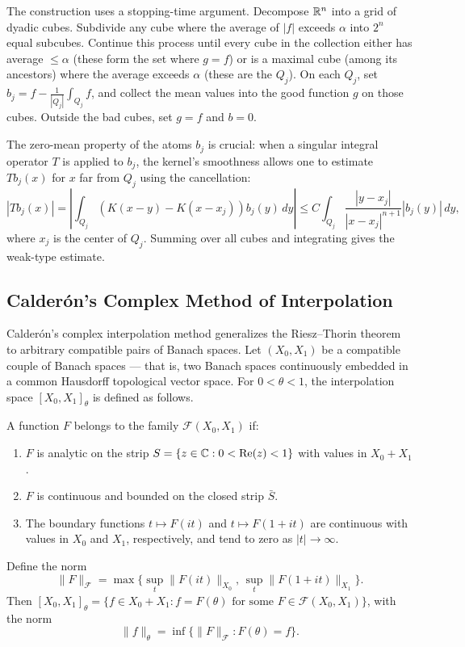 The construction uses a stopping-time argument. Decompose $\mathbb{R}^n$ into a grid of dyadic cubes. Subdivide any cube where the average of $|f|$ exceeds $\alpha$ into $2^n$ equal subcubes. Continue this process until every cube in the collection either has average $\leq \alpha$ (these form the set where $g = f$) or is a maximal cube (among its ancestors) where the average exceeds $\alpha$ (these are the $Q_j$). On each $Q_j$, set $b_j = f - \frac{1}{|Q_j|} \int_{Q_j} f$, and collect the mean values into the good function $g$ on those cubes. Outside the bad cubes, set $g = f$ and $b = 0$.

The zero-mean property of the atoms $b_j$ is crucial: when a singular integral operator $T$ is applied to $b_j$, the kernel's smoothness allows one to estimate $Tb_j(x)$ for $x$ far from $Q_j$ using the cancellation:
\[
|Tb_j(x)| = \left|\int_{Q_j} (K(x-y) - K(x - x_j)) b_j(y)\,dy\right| \leq C \int_{Q_j} \frac{|y - x_j|}{|x - x_j|^{n+1}} |b_j(y)|\,dy,
\]
where $x_j$ is the center of $Q_j$. Summing over all cubes and integrating gives the weak-type estimate.

\subsection{Calder\'{o}n's Complex Method of Interpolation}

Calder\'{o}n's complex interpolation method generalizes the Riesz--Thorin theorem to arbitrary compatible pairs of Banach spaces. Let $(X_0, X_1)$ be a compatible couple of Banach spaces --- that is, two Banach spaces continuously embedded in a common Hausdorff topological vector space. For $0 < \theta < 1$, the interpolation space $[X_0, X_1]_\theta$ is defined as follows.

\begin{definition}
A function $F$ belongs to the family $\mathcal{F}(X_0, X_1)$ if:
\begin{enumerate}
    \item $F$ is analytic on the strip $S = \{z \in \mathbb{C} : 0 < \operatorname{Re}(z) < 1\}$ with values in $X_0 + X_1$.
    \item $F$ is continuous and bounded on the closed strip $\bar S$.
    \item The boundary functions $t \mapsto F(it)$ and $t \mapsto F(1+it)$ are continuous with values in $X_0$ and $X_1$, respectively, and tend to zero as $|t| \to \infty$.
\end{enumerate}
Define the norm
\[
\|F\|_{\mathcal{F}} = \max\bigl\{\sup_t \|F(it)\|_{X_0}, \, \sup_t \|F(1+it)\|_{X_1}\bigr\}.
\]
Then $[X_0, X_1]_\theta = \{f \in X_0 + X_1 : f = F(\theta) \text{ for some } F \in \mathcal{F}(X_0, X_1)\}$, with the norm
\[
\|f\|_\theta = \inf\{\|F\|_{\mathcal{F}} : F(\theta) = f\}.
\]
\end{definition}

